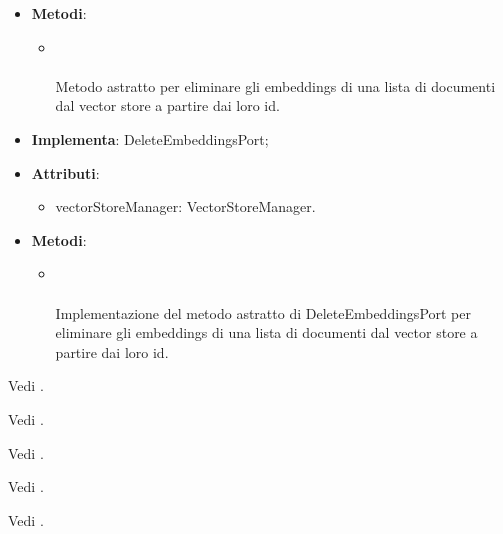 \documentclass[10pt, a4paper]{article}
\begin{document}
\label{DeleteEmbeddingsPortDettaglio}
\begin{itemize}
    \item \textbf{Metodi}:
    \begin{itemize}
        \item {}\\ \\
        Metodo astratto per eliminare gli embeddings di una lista di documenti dal vector store a partire dai loro id.
    \end{itemize}
\end{itemize}

\label{DeleteEmbeddingsVectorStoreDettaglio}
\begin{itemize}
    \item \textbf{Implementa}: DeleteEmbeddingsPort;
    \item \textbf{Attributi}:
    \begin{itemize}
        \item vectorStoreManager: VectorStoreManager.
    \end{itemize}
    \item \textbf{Metodi}:
    \begin{itemize}
        \item {}\\ \\
        Implementazione del metodo astratto di DeleteEmbeddingsPort per eliminare gli embeddings di una lista di documenti dal vector store a partire dai loro id.
    \end{itemize}
\end{itemize}

Vedi .

Vedi .

Vedi .

Vedi .


Vedi .
\end{document}
